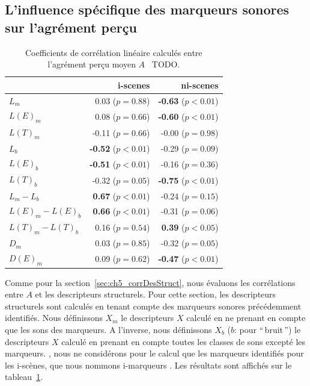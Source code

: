 \subsection{L'influence spécifique des marqueurs sonores sur l'agrément perçu}

\begin{table}[t]
\centering
\begin{tabular}{l r r} 
               &   i-scenes                   & ni-scenes \\
\hline
$L_m$            & 0.03  ($p=0.88$)           & \textbf{-0.63} ($p<0.01$) \\
$L(E)_m$           & 0.08  ($p=0.66$)           & \textbf{-0.60} ($p<0.01$) \\
$L(T)_m$           & -0.11 ($p=0.66$)           & -0.00 ($p=0.98$) \\
$L_b$            & \textbf{-0.52} ($p<0.01$)  & -0.29 ($p=0.09$) \\
$L(E)_b$           & \textbf{-0.51} ($p<0.01$)  & -0.16 ($p=0.36$) \\
$L(T)_b$           & -0.32 ($p=0.05$)           & \textbf{-0.75} ($p<0.01$) \\
$L_m-L_b$        & \textbf{0.67} ($p<0.01$)   & -0.24 ($p=0.15$) \\
$L(E)_m-L(E)_b$      & \textbf{0.66} ($p<0.01$)   & -0.31 ($p=0.06$) \\
$L(T)_m-L(T)_b$      & 0.16 ($p=0.54$)            & \textbf{0.39} ($p<0.05$) \\
$D_m$            & 0.03 ($p=0.85$)            & -0.32 ($p=0.05$) \\
$D(E)_m$           & 0.09  ($p=0.62$)           & \textbf{-0.47} ($p<0.01$) \\
\hline
\end{tabular}
\vspace{0.5mm}
\caption{Coefficients de corrélation linéaire calculés entre l'agrément perçu moyen $A$ \vs~TODO.}
\label{tab:corrMarkers}
\end{table}

Comme pour la  section~\ref{sec:ch5_corrDesStruct}, nous évaluons les corrélations entre $A$ et les descripteurs structurels. Pour cette section, les descripteurs structurels sont calculés en tenant compte des marqueurs sonores précédemment identifiés. Nous définissons $X_m$ le descripteurs $X$ calculé en ne prenant en compte que les sons des marqueurs. A l'inverse, nous définissons $X_b$ ($b$: pour ``\,bruit\,'') le descripteurs $X$ calculé en prenant en compte toutes les classes de sons excepté les marqueurs.  , nous ne considérons pour le calcul que les marqueurs identifiés pour les i-scènes, que nous nommons i-marqueurs  . Les résultats sont affichés sur le tableau~\ref{tab:corrMarkers}.

